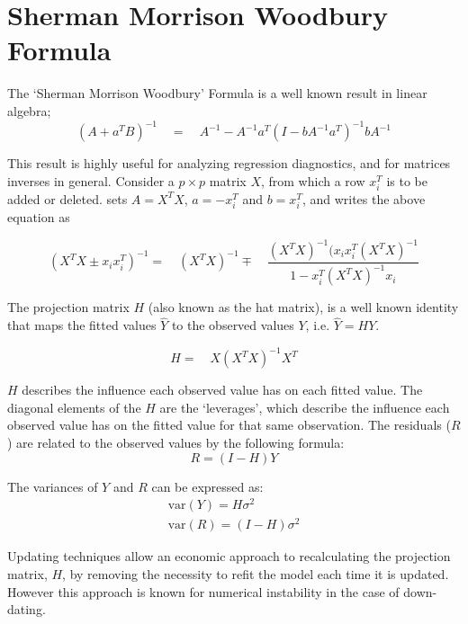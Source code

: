 \documentclass[12pt, a4paper]{report}
\theoremstyle{plain}
\theoremstyle{definition}
\theoremstyle{remark}
\begin{document}
\section{Sherman Morrison Woodbury Formula} %

The `Sherman Morrison Woodbury' Formula is a well known result in
linear algebra;
\begin{equation}
(A+a^{T}B)^{-1} \quad = \quad A^{-1}-
A^{-1}a^{T}(I-bA^{-1}a^{T})^{-1}bA^{-1}
\end{equation}

This result is highly useful for analyzing regression diagnostics,
and for matrices inverses in general. Consider a $p \times p$
matrix $X$, from which a row $x_{i}^{T}$ is to be added or
deleted. \citet{CookWeisberg} sets $A = X^{T}X$, $a=-x_{i}^{T}$
and $b=x_{i}^{T}$, and writes the above equation as

\begin{equation}
(X^{T}X \pm x_{i}x_{i}^{T})^{-1} = \quad(X^{T}X )^{-1} \mp \quad
\frac{(X^{T}X)^{-1}(x_{i}x_{i}^{T}(X^{T}X)^{-1}}{1-x_{i}^{T}(X^{T}X)^{-1}x_{i}}
\end{equation}

The projection matrix $H$ (also known as the hat matrix), is a
well known identity that maps the fitted values $\hat{Y}$ to the
observed values $Y$, i.e. $\hat{Y} = HY$.

\begin{equation}
H =\quad X(X^{T}X)^{-1}X^{T}
\end{equation}

$H$ describes the influence each observed value has on each fitted
value. The diagonal elements of the $H$ are the `leverages', which
describe the influence each observed value has on the fitted value
for that same observation. The residuals ($R$) are related to the
observed values by the following formula:
\begin{equation}
R = (I-H)Y
\end{equation}

The variances of $Y$ and $R$ can be expressed as:
\begin{eqnarray}
\mbox{var}(Y) = H\sigma^{2} \nonumber\\
\mbox{var}(R) = (I-H)\sigma^{2}
\end{eqnarray}

Updating techniques allow an economic approach to recalculating
the projection matrix, $H$, by removing the necessity to refit the
model each time it is updated. However this approach is known for
numerical instability in the case of down-dating.
\end{document}
